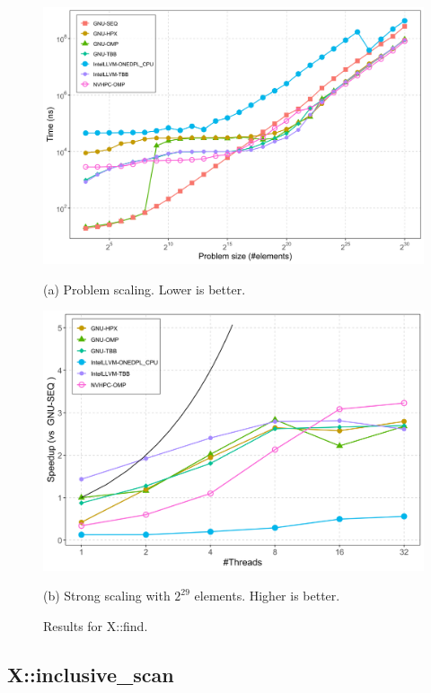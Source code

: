 \documentclass[sigconf]{acmart}
\begin{document}
\begin{figure}[H]
      \centering
      \begin{minipage}[t]{0.48\linewidth}
            \centering
            \includegraphics[width=\linewidth]{figures/problemSize_time-find.png}
            \caption*{(a) Problem scaling. Lower is better.}
      \end{minipage}
      \hfill
      \begin{minipage}[t]{0.48\linewidth}
            \centering
            \includegraphics[width=\linewidth]{figures/speedup_threads-find.png}
            \caption*{(b) Strong scaling with $2^{29}$ elements. Higher is better.}
      \end{minipage}
      \caption{Results for X::find.}\label{fig:x::find}
\end{figure}

\subsection{X::inclusive\_scan}
\end{document}
